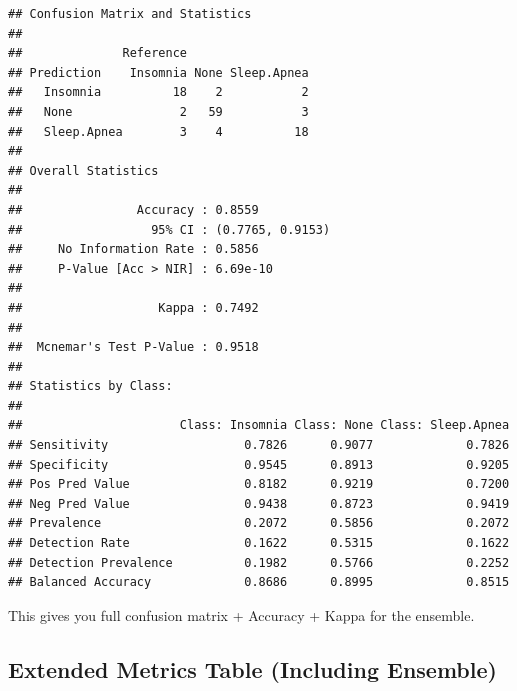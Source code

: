 \documentclass[
]{article}
\newenvironment{Shaded}{\begin{snugshade}}{\end{snugshade}}
\newcommand{\AttributeTok}[1]{\textcolor[rgb]{0.13,0.29,0.53}{#1}}
\newcommand{\DecValTok}[1]{\textcolor[rgb]{0.00,0.00,0.81}{#1}}
\newcommand{\FunctionTok}[1]{\textcolor[rgb]{0.13,0.29,0.53}{\textbf{#1}}}
\newcommand{\NormalTok}[1]{#1}
\newcommand{\OtherTok}[1]{\textcolor[rgb]{0.56,0.35,0.01}{#1}}
\newcommand{\SpecialCharTok}[1]{\textcolor[rgb]{0.81,0.36,0.00}{\textbf{#1}}}
\newcommand{\StringTok}[1]{\textcolor[rgb]{0.31,0.60,0.02}{#1}}
\begin{document}
\begin{verbatim}
## Confusion Matrix and Statistics
## 
##              Reference
## Prediction    Insomnia None Sleep.Apnea
##   Insomnia          18    2           2
##   None               2   59           3
##   Sleep.Apnea        3    4          18
## 
## Overall Statistics
##                                           
##                Accuracy : 0.8559          
##                  95% CI : (0.7765, 0.9153)
##     No Information Rate : 0.5856          
##     P-Value [Acc > NIR] : 6.69e-10        
##                                           
##                   Kappa : 0.7492          
##                                           
##  Mcnemar's Test P-Value : 0.9518          
## 
## Statistics by Class:
## 
##                      Class: Insomnia Class: None Class: Sleep.Apnea
## Sensitivity                   0.7826      0.9077             0.7826
## Specificity                   0.9545      0.8913             0.9205
## Pos Pred Value                0.8182      0.9219             0.7200
## Neg Pred Value                0.9438      0.8723             0.9419
## Prevalence                    0.2072      0.5856             0.2072
## Detection Rate                0.1622      0.5315             0.1622
## Detection Prevalence          0.1982      0.5766             0.2252
## Balanced Accuracy             0.8686      0.8995             0.8515
\end{verbatim}

This gives you full confusion matrix + Accuracy + Kappa for the
ensemble.

\subsection{Extended Metrics Table (Including
Ensemble)}\label{extended-metrics-table-including-ensemble}

\begin{Shaded}
\end{Shaded}
\end{document}
